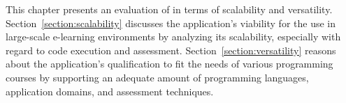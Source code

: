 This chapter presents an evaluation of \tool in terms of scalability and versatility. Section~\ref{section:scalability} discusses the application's viability for the use in large-scale e-learning environments by analyzing its scalability, especially with regard to code execution and assessment. Section~\ref{section:versatility} reasons about the application's qualification to fit the needs of various programming courses by supporting an adequate amount of programming languages, application domains, and assessment techniques.
